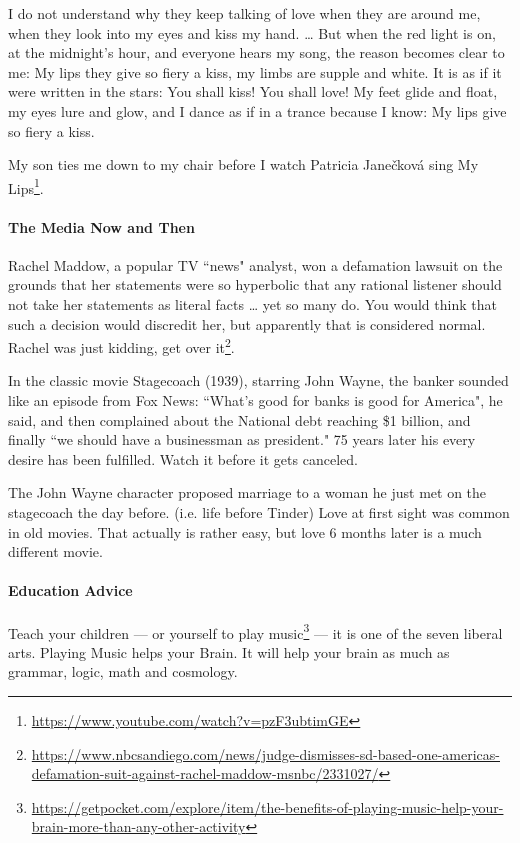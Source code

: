 \begin{quotex}
I do not understand why they keep talking of love when they are around me, when they look into my eyes and kiss my hand. … But when the red light is on, at the midnight's hour, and everyone hears my song, the reason becomes clear to me: My lips they give so fiery a kiss, my limbs are supple and white. It is as if it were written in the stars: You shall kiss! You shall love! My feet glide and float, my eyes lure and glow, and I dance as if in a trance because I know: My lips give so fiery a kiss.

\end{quotex}
My son ties me down to my chair before I watch Patricia Janečková sing My Lips\footnote{\url{https://www.youtube.com/watch?v=pzF3ubtimGE}}.

\paragraph{The Media Now and Then}
Rachel Maddow, a popular TV ``news" analyst, won a defamation lawsuit on the grounds that her statements were so hyperbolic that any rational listener should not take her statements as literal facts … yet so many do. You would think that such a decision would discredit her, but apparently that is considered normal. Rachel was just kidding, get over it\footnote{\url{https://www.nbcsandiego.com/news/judge-dismisses-sd-based-one-americas-defamation-suit-against-rachel-maddow-msnbc/2331027/}}.

In the classic movie Stagecoach (1939), starring John Wayne, the banker sounded like an episode from Fox News: ``What's good for banks is good for America", he said, and then complained about the National debt reaching \$1 billion, and finally ``we should have a businessman as president." 75 years later his every desire has been fulfilled. Watch it before it gets canceled.

The John Wayne character proposed marriage to a woman he just met on the stagecoach the day before. (i.e. life before Tinder) Love at first sight was common in old movies. That actually is rather easy, but love 6 months later is a much different movie.

\paragraph{Education Advice}
Teach your children — or yourself to play music\footnote{\url{https://getpocket.com/explore/item/the-benefits-of-playing-music-help-your-brain-more-than-any-other-activity}} — it is one of the seven liberal arts. Playing Music helps your Brain. It will help your brain as much as grammar, logic, math and cosmology.

